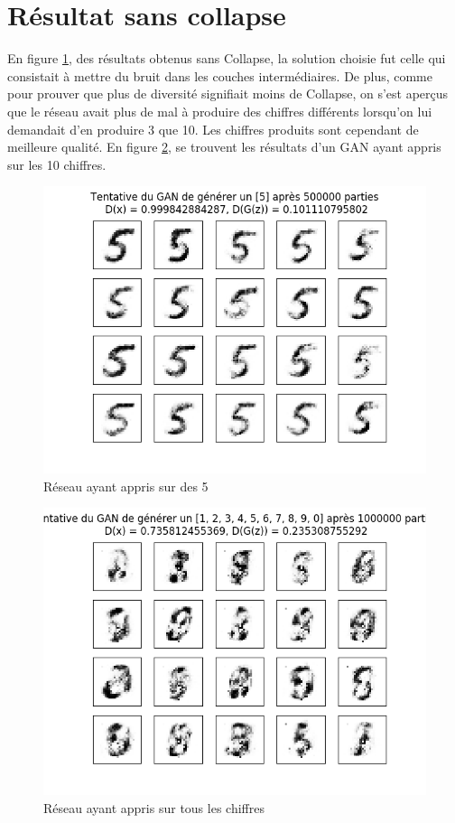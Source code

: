 	



\section{Résultat sans collapse}
En figure \ref{fig:resultat5}, des résultats obtenus sans Collapse, la solution choisie fut celle qui consistait à mettre du bruit dans les couches intermédiaires. De plus, comme pour prouver que plus de diversité signifiait moins de Collapse, on s'est aperçus que le réseau avait plus de mal à produire des chiffres différents lorsqu'on lui demandait d'en produire 3 que 10. Les chiffres produits sont cependant de meilleure qualité. En figure \ref{fig:tableauDeChasse}, se trouvent les résultats d'un GAN ayant appris sur les 10 chiffres.

\begin{figure}[h]
  \centerline{\includegraphics[width=0.6\linewidth]{fig/BeauResultat5.png}}
  \caption{Réseau ayant appris sur des 5}
  \label{fig:resultat5}
\end{figure}
\begin{figure}[h]
  \centerline{\includegraphics[width=0.6\linewidth]{fig/GANresultats.png}}
  \caption{Réseau ayant appris sur tous les chiffres}
  \label{fig:tableauDeChasse}
\end{figure}

